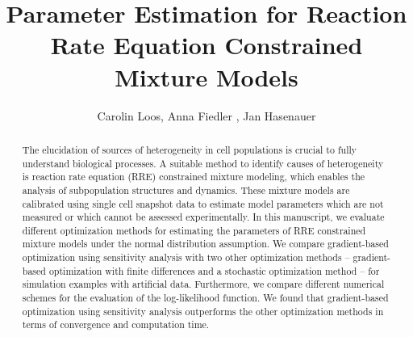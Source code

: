 \documentclass{llncs}
\begin{document}
\mainmatter              %
%
\title{Parameter Estimation for Reaction Rate Equation Constrained Mixture Models}
%
\author{Carolin Loos, Anna Fiedler , Jan Hasenauer }
%

%

\maketitle              %

\begin{abstract}
The elucidation of sources of heterogeneity in cell populations is crucial to fully understand biological processes. A suitable method to identify causes of heterogeneity is reaction rate equation (RRE) constrained mixture modeling, which enables the analysis of subpopulation structures and dynamics. These mixture models are calibrated using single cell snapshot data to estimate model parameters which are not measured or which cannot be assessed experimentally. In this manuscript, we evaluate different optimization methods for estimating the parameters of RRE constrained mixture models under the normal distribution assumption. We compare gradient-based optimization using sensitivity analysis with two other optimization methods -- gradient-based optimization with finite differences and a stochastic optimization method -- for simulation examples with artificial data. Furthermore, we compare different numerical schemes for the evaluation of the log-likelihood function. We found that gradient-based optimization using sensitivity analysis outperforms the other optimization methods in terms of convergence and computation time.
\end{abstract}
%
\end{document}
